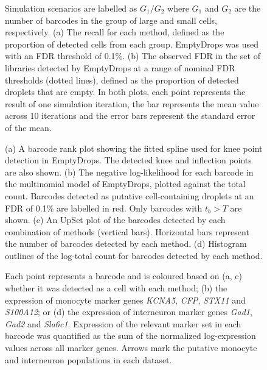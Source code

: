 \documentclass{bmcart}
\begin{document}
\begin{figure}[h!]
\caption{
Simulation scenarios are labelled as $G_1/G_2$ where $G_1$ and $G_2$ are the number of barcodes in the group of large and small cells, respectively.
(a) The recall for each method, defined as the proportion of detected cells from each group.
EmptyDrops was used with an FDR threshold of 0.1\%.
(b) The observed FDR in the set of libraries detected by EmptyDrops at a range of nominal FDR thresholds (dotted lines), defined as the proportion of detected droplets that are empty.
In both plots, each point represents the result of one simulation iteration, the bar represents the mean value across 10 iterations and the error bars represent the standard error of the mean.
}
\label{fig:simpbmc}
\end{figure}

\begin{figure}[h!]
\caption{
(a) A barcode rank plot showing the fitted spline used for knee point detection in EmptyDrops. 
The detected knee and inflection points are also shown.
(b) The negative log-likelihood for each barcode in the multinomial model of EmptyDrops, plotted against the total count.
Barcodes detected as putative cell-containing droplets at an FDR of 0.1\% are labelled in red.
Only barcodes with $t_b > T$ are shown.
(c) An UpSet plot \cite{lex2014upset} of the barcodes detected by each combination of methods (vertical bars).
Horizontal bars represent the number of barcodes detected by each method.
(d) Histogram outlines of the log-total count for barcodes detected by each method.
}
\label{fig:realplacenta}
\end{figure}

\begin{figure}[h!]
\caption{
Each point represents a barcode and is coloured based on (a, c) whether it was detected as a cell with each method;
(b) the expression of monocyte marker genes \textit{KCNA5}, \textit{CFP}, \textit{STX11} and \textit{S100A12};
or (d) the expression of interneuron marker genes \textit{Gad1}, \textit{Gad2} and \textit{Sla6c1}.
Expression of the relevant marker set in each barcode was quantified as the sum of the normalized log-expression values across all marker genes.
Arrows mark the putative monocyte and interneuron populations in each dataset.
}
\label{fig:realtsne}
\end{figure}
\end{document}
